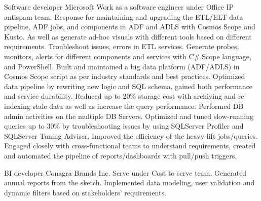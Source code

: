 \documentclass[a4paper]{ReadableCV}
\begin{document}
{}
        {Software developer}
        {Microsoft}
        {Work as a software engineer under Office IP antispam team. Response for maintaining and upgrading the ETL/ELT data pipeline, ADF jobs, and components in ADF and ADLS with Cosmos Scope and Kusto. As well as generate ad-hoc visuals with different tools based on different requirements. }
{Troubleshoot issues, errors in ETL services. Generate probes, monitors, alerts for different components and services with C\#,Scope language, and PowerShell.}
{Built and maintained a big data platform (ADF/ADLS) in Cosmos Scope script as per industry standards and best practices.}
{Optimized data pipeline by rewriting new logic and SQL schema, gained both performance and service durability. Reduced up to 20\% storage cost with archiving and re-indexing stale data as well as increase the query performance.}
{Performed DB admin activities on the multiple DB Servers. Optimized and tuned slow-running queries up to 30\% by troubleshooting issues by using SQLServer Profiler and SQLServer Tuning Adviser. Improved the efficiency of the heavy-lift jobs/queries.}
 {Engaged closely with cross-functional teams to understand requirements, created and automated the pipeline of reports/dashboards with pull/push triggers.}

{BI developer}
{Conagra Brands Inc.}
{Serve under Cost to serve team. Generated annual reports from the sketch.  Implemented data modeling, user validation and dynamic filters based on stakeholders' requirements.}
\end{document}
